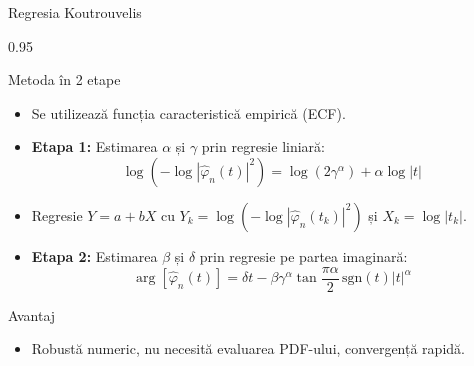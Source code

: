 \documentclass[9pt, aspectratio=169, t]{beamer}
\begin{document}
\begin{frame}{Regresia Koutrouvelis}
    \begin{cminipage}{0.95\textwidth}
\begin{block}{Metoda în 2 etape}
\begin{itemize}\setlength{\itemsep}{0pt}
    \item Se utilizează funcția caracteristică empirică (ECF).
\end{itemize}
\end{block}

\begin{itemize}\setlength{\itemsep}{0pt}
    \item \textbf{Etapa 1:} Estimarea $\alpha$ și $\gamma$ prin regresie liniară:
$$\log\left(-\log|\hat{\varphi}_n(t)|^2\right) = \log(2\gamma^\alpha) + \alpha \log|t|$$
    \item Regresie $Y = a + bX$ cu $Y_k = \log(-\log|\hat{\varphi}_n(t_k)|^2)$ și $X_k = \log|t_k|$.
    \item \textbf{Etapa 2:} Estimarea $\beta$ și $\delta$ prin regresie pe partea imaginară:
$$\arg[\hat{\varphi}_n(t)] = \delta t - \beta\gamma^\alpha \tan\frac{\pi\alpha}{2}\,\text{sgn}(t)|t|^\alpha$$
\end{itemize}

\begin{alertblock}{Avantaj}
\begin{itemize}\setlength{\itemsep}{0pt}
    \item Robustă numeric, nu necesită evaluarea PDF-ului, convergență rapidă.
\end{itemize}
\end{alertblock}
    \end{cminipage}
\end{frame}
\end{document}
